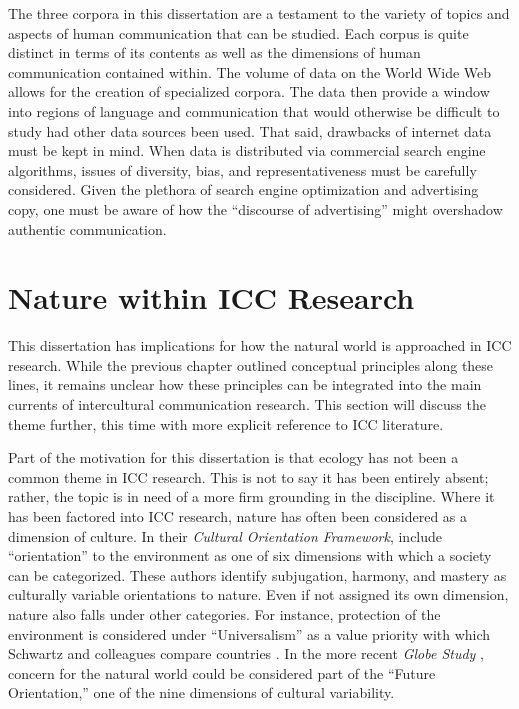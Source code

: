 The three corpora in this dissertation are a testament to the variety of topics and aspects of human communication that can be studied. Each corpus is quite distinct in terms of its contents as well as the dimensions of human communication contained within. The volume of data on the World Wide Web allows for the creation of specialized corpora. The data then provide a window into regions of language and communication that would otherwise be difficult to study had other data sources been used. That said, drawbacks of internet data must be kept in mind. When data is distributed via commercial search engine algorithms, issues of diversity, bias, and representativeness must be carefully considered. Given the plethora of search engine optimization and advertising copy, one must be aware of how the ``discourse of advertising'' \citep[99]{CurtisCollins2019} might overshadow authentic communication.

\section{Nature within ICC Research}

This dissertation has implications for how the natural world is approached in ICC research. While the previous chapter outlined conceptual principles along these lines, it remains unclear how these principles can be integrated into the main currents of intercultural communication research. This section will discuss the theme further, this time with more explicit reference to ICC literature.  

Part of the motivation for this dissertation is that ecology has not been a common theme in ICC research. This is not to say it has been entirely absent; rather, the topic is in need of a more firm grounding in the discipline. Where it has been factored into ICC research, nature has often been considered as a dimension of culture. In their \textit{Cultural Orientation Framework}, \cite{Kluckhohn1961} include ``orientation'' to the environment as one of six dimensions with which a society can be categorized. These authors identify subjugation, harmony, and mastery as culturally variable orientations to nature. Even if not assigned its own dimension, nature also falls under other categories. For instance, protection of the environment is considered under ``Universalism'' as a value priority with which Schwartz and colleagues compare countries \citep{Sagiv2000}. In the more recent \textit{Globe Study} \citep{House2004}, concern for the natural world could be considered part of the ``Future Orientation,'' one of the nine dimensions of cultural variability.

